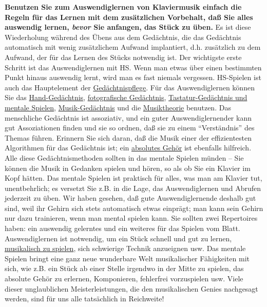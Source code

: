 \textbf{Benutzen Sie zum Auswendiglernen von Klaviermusik einfach die Regeln für das Lernen mit dem zusätzlichen Vorbehalt, daß Sie alles auswendig lernen, \textit{bevor} Sie anfangen, das Stück zu üben.}
Es ist diese Wiederholung während des Übens aus dem Gedächtnis, die das Gedächtnis automatisch mit wenig zusätzlichem Aufwand implantiert, d.h. zusätzlich zu dem Aufwand, der für das Lernen des Stücks notwendig ist.
Der wichtigste erste Schritt ist das Auswendiglernen mit HS.
Wenn man etwas über einen bestimmten Punkt hinaus auswendig lernt, wird man es fast niemals vergessen.
HS-Spielen ist auch das Hauptelement der \hyperref[c1iii6k]{Gedächtnispflege}.
Für das Auswendiglernen können Sie das \hyperref[c1iii6hand]{Hand-Gedächtnis}, \hyperref[c1iii6foto]{fotografische Gedächtnis}, \hyperref[c1iii6tastatur]{Tastatur-Gedächtnis und mentale Spielen}, \hyperref[c1iii6musik]{Musik-Gedächtnis} und die \hyperref[c1iii6theorie]{Musiktheorie} benutzen.
Das menschliche Gedächtnis ist assoziativ, und ein guter Auswendiglernender kann gut Assoziationen finden und sie so ordnen, daß sie zu einem \enquote{Verständnis} des Themas führen.
Erinnern Sie sich daran, daß die Musik einer der effizientesten Algorithmen für das Gedächtnis ist; ein \hyperref[c1iii12]{absolutes Gehör} ist ebenfalls hilfreich.
Alle diese Gedächtnismethoden sollten in das mentale Spielen münden -- Sie können die Musik in Gedanken spielen und hören, so als ob Sie ein Klavier im Kopf hätten.
Das mentale Spielen ist praktisch für alles, was man am Klavier tut, unentbehrlich; es versetzt Sie z.B. in die Lage, das Auswendiglernen und Abrufen jederzeit zu üben.
Wir haben gesehen, daß gute Auswendiglernende deshalb gut sind, weil ihr Gehirn sich stets automatisch etwas einprägt; man kann sein Gehirn nur dazu trainieren, wenn man mental spielen kann.
Sie sollten zwei Repertoires haben: ein auswendig gelerntes und ein weiteres für das Spielen vom Blatt.
Auswendiglernen ist notwendig, um ein Stück schnell und gut zu lernen, \hyperref[c1iii14d]{musikalisch zu spielen}, sich schwierige Technik anzueignen usw.
Das mentale Spielen bringt eine ganz neue wunderbare Welt musikalischer Fähigkeiten mit sich, wie z.B. ein  Stück ab einer Stelle irgendwo in der Mitte zu spielen, das absolute Gehör zu erlernen, Komponieren, fehlerfrei vorzuspielen usw.
Viele dieser unglaublichen Meisterleistungen, die den musikalischen Genies nachgesagt werden, sind für uns alle tatsächlich in Reichweite!



